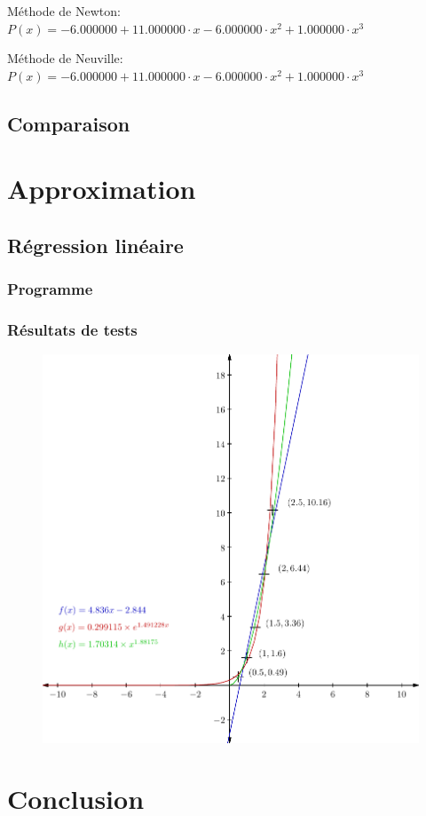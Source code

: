 \documentclass{report}
\begin{document}
	Méthode de Newton: $P(x)= -6.000000 + 11.000000 \cdot x- 6.000000 \cdot x^{2}  + 1.000000 \cdot x^{3} $

	Méthode de Neuville: $P(x)= -6.000000 + 11.000000 \cdot x- 6.000000 \cdot x^{2}  + 1.000000 \cdot x^{3} $

	\renewcommand{\arraystretch}{2}
	\renewcommand{\arraystretch}{1}
    \section{Comparaison}
  \chapter{Approximation}
    \section{Régression linéaire}
      \subsection{Programme}
	
      \subsection{Résultats de tests}
	\begin{figure}
	  \includegraphics{graphiques/pdf_output/reglin.pdf}
	\end{figure}
	\renewcommand{\arraystretch}{2}
	\renewcommand{\arraystretch}{1}
  \chapter{Conclusion}
\end{document}

